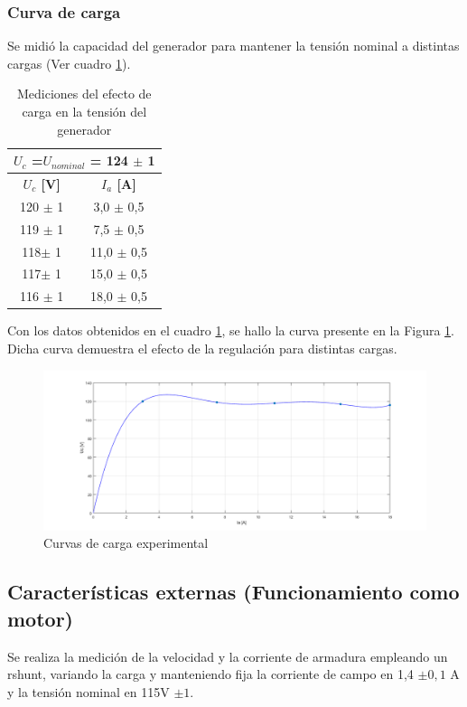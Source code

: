 \documentclass[11pt,letterpaper]{article}     %
\begin{document}
\subsubsection{Curva de carga}
Se midió la capacidad del generador para mantener la tensión nominal a distintas cargas (Ver cuadro \ref{MedCurvaCarga}). 
\begin{table}[H]
	\centering
	\caption{Mediciones del efecto de carga en la tensión del generador}
	\label{MedCurvaCarga}
	\begin{tabular}{|c|c|}
		\hline
		\multicolumn{2}{|c|}{\textbf{$U_{c}$ =$U_{nominal}$ = 124 $\pm$ 1}} \\ \hline
		\textbf{$U_{c}$ {[}V{]}}         & \textbf{$I_{a}$ {[}A{]}}         \\ \hline
		120 $\pm$ 1                      & 3,0 $\pm$ 0,5                    \\ \hline
		119 $\pm$ 1                      & 7,5 $\pm$ 0,5                    \\ \hline
		118$\pm$ 1                       & 11,0 $\pm$ 0,5                   \\ \hline
		117$\pm$ 1                       & 15,0 $\pm$ 0,5                   \\ \hline
		116 $\pm$ 1                      & 18,0 $\pm$ 0,5                   \\ \hline
	\end{tabular}
\end{table}
Con los datos obtenidos en el cuadro \ref{MedCurvaCarga}, se hallo la curva presente en la Figura \ref{fig:CurvaDeCarga}. Dicha curva demuestra el efecto de la regulación para distintas cargas.
\begin{figure}[H]
	\centering
	\includegraphics[scale=0.5]{./recursos-Lab6/CurvaDeCarga.png}
	\caption{Curvas de carga experimental}
	\label{fig:CurvaDeCarga}
\end{figure}
\subsection{Características externas (Funcionamiento como motor)}
	Se realiza la medición de la velocidad y la corriente de armadura empleando un rshunt, variando la carga y manteniendo fija la corriente de campo en 1,4 $\pm0,1$ A y la tensión nominal en 115V $\pm1$.\\
	
\end{document}
